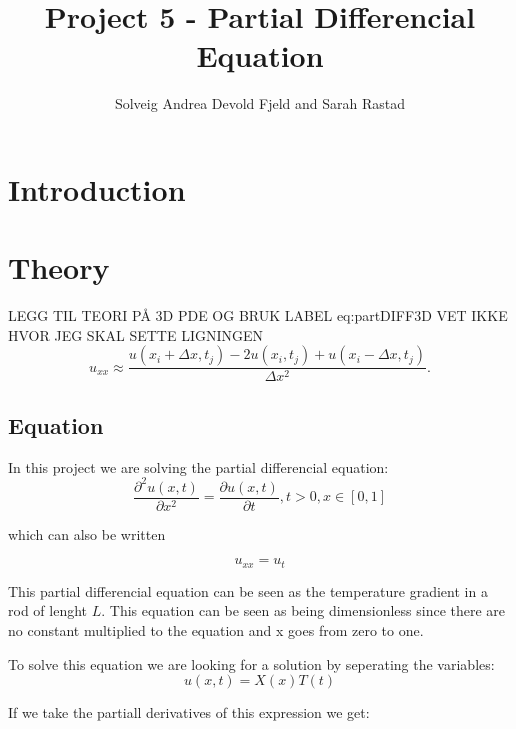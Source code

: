 \documentclass[a4paper,10pt]{article}
\title{Project 5 - Partial Differencial Equation}
\author{Solveig Andrea Devold Fjeld and Sarah Rastad}
\begin{document}
\maketitle

\begin{abstract}

\end{abstract}

\section{Introduction}




\section{Theory}
LEGG TIL TEORI PÅ 3D PDE OG BRUK LABEL eq:partDIFF3D
VET IKKE HVOR JEG SKAL SETTE LIGNINGEN
\begin{equation}
u_{xx}\approx \frac{u(x_i+\Delta x,t_j)-2u(x_i,t_j)+u(x_i-\Delta x,t_j)}{\Delta x^2}.
\label{eq:u_xx}
\end{equation}

\subsection{Equation}
In this project we are solving the partial differencial equation:
\begin{equation}
  \frac{\partial^2 u(x,t)}{\partial x^2} =\frac{\partial u(x,t)}{\partial t}, t> 0, x\in [0,1]
  \label{eq:PartDiff}
\end{equation}

which can also be written

\begin{equation}
 u_{xx}=u_t
 \label{eq:simpleDiff}
\end{equation}

This partial differencial equation can be seen as the temperature gradient in a rod of lenght $L$. This equation can be seen as being dimensionless
since there are no constant multiplied to the equation and x goes from zero to one.

To solve this equation we are looking for a solution by seperating the variables:
\begin{equation}
u(x,t) = X(x)T(t)
\label{eq:seperating}
\end{equation}

If we take the partiall derivatives of this expression we get:
\end{document}
